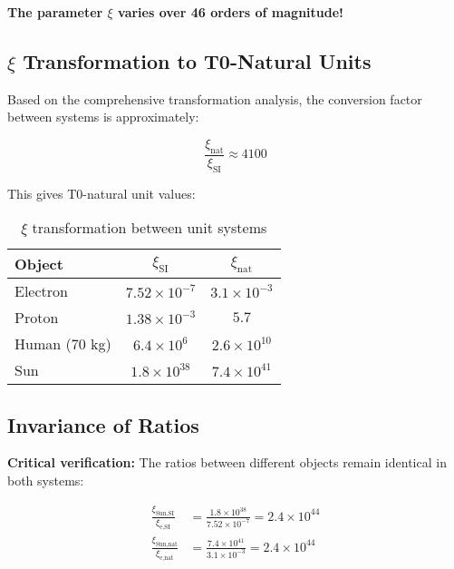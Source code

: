 \documentclass[12pt,a4paper]{article}
\newcommand{\xipar}{\xi}
\begin{document}
	\textbf{The parameter $\xipar$ varies over 46 orders of magnitude!}
	
	\subsection{$\xipar$ Transformation to T0-Natural Units}
	\label{subsec:xi_transformation}
	
	Based on the comprehensive transformation analysis, the conversion factor between systems is approximately:
	
	$$\frac{\xipar_{\text{nat}}}{\xipar_{\text{SI}}} \approx 4100$$
	
	This gives T0-natural unit values:
	
	\begin{table}[htbp]
		\centering
		\begin{tabular}{lcc}
			\toprule
			\textbf{Object} & \textbf{$\xipar_{\text{SI}}$} & \textbf{$\xipar_{\text{nat}}$} \\
			\midrule
			Electron & $7.52 \times 10^{-7}$ & $3.1 \times 10^{-3}$ \\
			Proton & $1.38 \times 10^{-3}$ & $5.7$ \\
			Human (70 kg) & $6.4 \times 10^{6}$ & $2.6 \times 10^{10}$ \\
			Sun & $1.8 \times 10^{38}$ & $7.4 \times 10^{41}$ \\
			\bottomrule
		\end{tabular}
		\caption{$\xipar$ transformation between unit systems}
		\label{tab:xi_transformation}
	\end{table}
	
	\subsection{Invariance of Ratios}
	\label{subsec:xi_ratio_invariance}
	
	\textbf{Critical verification:} The ratios between different objects remain identical in both systems:
	
	\begin{align}
		\frac{\xipar_{\text{Sun},\text{SI}}}{\xipar_{\text{e},\text{SI}}} &= \frac{1.8 \times 10^{38}}{7.52 \times 10^{-7}} = 2.4 \times 10^{44} \\
		\frac{\xipar_{\text{Sun},\text{nat}}}{\xipar_{\text{e},\text{nat}}} &= \frac{7.4 \times 10^{41}}{3.1 \times 10^{-3}} = 2.4 \times 10^{44}
	\end{align}
	
	
\end{document}
